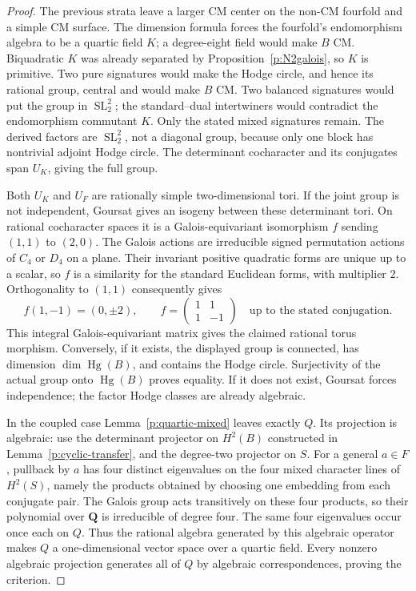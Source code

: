 \documentclass[10pt,reqno]{article}
\theoremstyle{emphasizedplain}
\theoremstyle{emphasizeddefinition}
\theoremstyle{emphasizeddefinition}
\DeclareMathOperator{\Hg}{Hg}
\DeclareMathOperator{\SL}{SL}
\newcommand{\Q}{\mathbf Q}
\begin{document}
\begin{proof}
The previous strata leave a larger CM center on the non-CM
fourfold and a simple CM surface. The dimension formula forces
the fourfold's endomorphism algebra to be a quartic field $K$;
a degree-eight field would make $B$ CM. Biquadratic $K$ was
already separated by Proposition~\ref{p:N2galois}, so $K$ is
primitive. Two pure signatures would make the Hodge circle,
and hence its rational group, central and would make $B$ CM.
Two balanced signatures would put the group in $\SL_2^2$;
the standard--dual intertwiners would contradict the endomorphism
commutant $K$. Only the stated mixed signatures remain. The
derived factors are $\SL_2^2$, not a diagonal group, because
only one block has nontrivial adjoint Hodge circle. The determinant
cocharacter and its conjugates span $U_K$, giving the full group.

Both $U_K$ and $U_F$ are rationally simple two-dimensional tori.
If the joint group is not independent, Goursat gives an isogeny
between these determinant tori. On rational cocharacter spaces
it is a Galois-equivariant isomorphism $f$ sending $(1,1)$ to
$(2,0)$. The Galois actions are irreducible signed permutation
actions of $C_4$ or $D_4$ on a plane. Their invariant positive
quadratic forms are unique up to a scalar, so $f$ is a similarity
for the standard Euclidean forms, with multiplier $2$.
Orthogonality to $(1,1)$ consequently gives
\[
 f(1,-1)=(0,\pm2),\qquad
 f=\begin{pmatrix}1&1\\1&-1\end{pmatrix}
 \quad\text{up to the stated conjugation}.
\]
This integral Galois-equivariant matrix gives the claimed rational
torus morphism. Conversely, if it exists, the displayed group is
connected, has dimension $\dim\Hg(B)$, and contains the Hodge
circle. Surjectivity of the actual group onto $\Hg(B)$ proves
equality. If it does not exist, Goursat forces independence;
the factor Hodge classes are already algebraic.

In the coupled case Lemma~\ref{p:quartic-mixed} leaves exactly
$Q$. Its projection is algebraic: use the determinant projector
on $H^2(B)$ constructed in Lemma~\ref{p:cyclic-transfer},
and the degree-two projector on $S$. For a general
$a\in F$, pullback by $a$ has four distinct eigenvalues on the
four mixed character lines of $H^2(S)$, namely the products
obtained by choosing one embedding from each conjugate pair.
The Galois group acts transitively on these four products, so
their polynomial over $\Q$ is irreducible of degree four.
The same four eigenvalues occur once each on $Q$.
Thus the rational algebra generated by this algebraic operator
makes $Q$ a one-dimensional vector space over a quartic field.
Every nonzero algebraic projection generates all of $Q$ by
algebraic correspondences, proving the criterion.
\end{proof}
\end{document}
